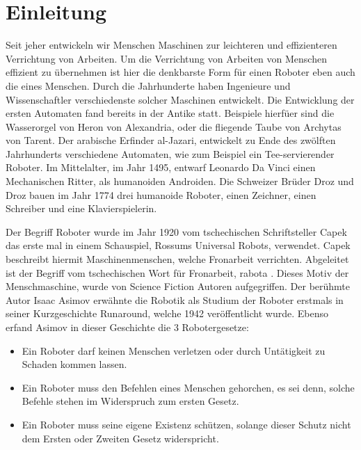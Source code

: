 \chapter{Einleitung}
\label{chap:Einleitung}

Seit jeher entwickeln wir Menschen Maschinen zur leichteren und effizienteren Verrichtung von Arbeiten. Um die Verrichtung von Arbeiten von Menschen effizient zu \"ubernehmen ist hier die denkbarste Form f\"ur einen Roboter eben auch die eines Menschen. Durch die Jahrhunderte haben Ingenieure und Wissenschaftler verschiedenste solcher Maschinen entwickelt. Die Entwicklung der ersten Automaten fand bereits in der Antike statt. Beispiele hierf\"uer sind die Wasserorgel von Heron von Alexandria, oder die fliegende Taube von Archytas von Tarent. Der arabische Erfinder al-Jazari, entwickelt zu Ende des zw\"olften Jahrhunderts verschiedene Automaten, wie zum Beispiel ein Tee-servierender Roboter. Im Mittelalter, im Jahr 1495, entwarf Leonardo Da Vinci einen Mechanischen Ritter, als humanoiden Androiden. Die Schweizer Br\"uder Droz und Droz bauen im Jahr 1774 drei humanoide Roboter, einen Zeichner, einen Schreiber und eine Klavierspielerin. 
\par\smallskip
Der Begriff Roboter wurde im Jahr 1920 vom tschechischen Schriftsteller Capek das erste mal in einem Schauspiel, Rossums Universal Robots\footnotemark[1], verwendet. Capek beschreibt hiermit Maschinenmenschen, welche Fronarbeit verrichten. Abgeleitet ist der Begriff vom tschechischen Wort für Fronarbeit, \glqq rabota \grqq. \newline
Dieses Motiv der Menschmaschine, wurde von Science Fiction Autoren aufgegriffen. Der ber\"uhmte Autor Isaac Asimov erw\"ahnte die Robotik als Studium der Roboter erstmals in seiner Kurzgeschichte Runaround\footnotemark[2], welche 1942 ver\"offentlicht wurde. Ebenso erfand Asimov in dieser Geschichte die 3 Robotergesetze:
\begin{itemize}
\item Ein Roboter darf keinen Menschen verletzen oder durch Untätigkeit zu Schaden kommen lassen.
\item Ein Roboter muss den Befehlen eines Menschen gehorchen, es sei denn, solche Befehle stehen im Widerspruch zum ersten Gesetz.
\item Ein Roboter muss seine eigene Existenz schützen, solange dieser Schutz nicht dem Ersten oder Zweiten Gesetz widerspricht.
\end{itemize}
\par\smallskip
